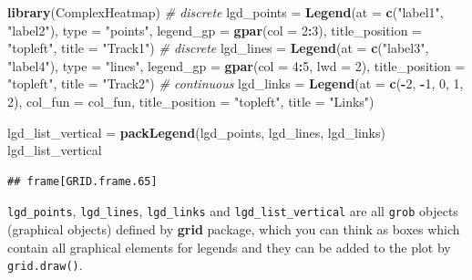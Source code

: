\documentclass[]{book}
\newenvironment{Shaded}{\begin{snugshade}}{\end{snugshade}}
\newcommand{\KeywordTok}[1]{\textcolor[rgb]{0.13,0.29,0.53}{\textbf{#1}}}
\newcommand{\DataTypeTok}[1]{\textcolor[rgb]{0.13,0.29,0.53}{#1}}
\newcommand{\DecValTok}[1]{\textcolor[rgb]{0.00,0.00,0.81}{#1}}
\newcommand{\StringTok}[1]{\textcolor[rgb]{0.31,0.60,0.02}{#1}}
\newcommand{\CommentTok}[1]{\textcolor[rgb]{0.56,0.35,0.01}{\textit{#1}}}
\newcommand{\OperatorTok}[1]{\textcolor[rgb]{0.81,0.36,0.00}{\textbf{#1}}}
\newcommand{\NormalTok}[1]{#1}
\theoremstyle{definition}
\theoremstyle{definition}
\theoremstyle{remark}
\begin{document}
\begin{Shaded}
\begin{Highlighting}[]
\KeywordTok{library}\NormalTok{(ComplexHeatmap)}
\CommentTok{# discrete}
\NormalTok{lgd_points =}\StringTok{ }\KeywordTok{Legend}\NormalTok{(}\DataTypeTok{at =} \KeywordTok{c}\NormalTok{(}\StringTok{"label1"}\NormalTok{, }\StringTok{"label2"}\NormalTok{), }\DataTypeTok{type =} \StringTok{"points"}\NormalTok{, }
    \DataTypeTok{legend_gp =} \KeywordTok{gpar}\NormalTok{(}\DataTypeTok{col =} \DecValTok{2}\OperatorTok{:}\DecValTok{3}\NormalTok{), }\DataTypeTok{title_position =} \StringTok{"topleft"}\NormalTok{, }
    \DataTypeTok{title =} \StringTok{"Track1"}\NormalTok{)}
\CommentTok{# discrete}
\NormalTok{lgd_lines =}\StringTok{ }\KeywordTok{Legend}\NormalTok{(}\DataTypeTok{at =} \KeywordTok{c}\NormalTok{(}\StringTok{"label3"}\NormalTok{, }\StringTok{"label4"}\NormalTok{), }\DataTypeTok{type =} \StringTok{"lines"}\NormalTok{, }
    \DataTypeTok{legend_gp =} \KeywordTok{gpar}\NormalTok{(}\DataTypeTok{col =} \DecValTok{4}\OperatorTok{:}\DecValTok{5}\NormalTok{, }\DataTypeTok{lwd =} \DecValTok{2}\NormalTok{), }\DataTypeTok{title_position =} \StringTok{"topleft"}\NormalTok{, }
    \DataTypeTok{title =} \StringTok{"Track2"}\NormalTok{)}
\CommentTok{# continuous}
\NormalTok{lgd_links =}\StringTok{ }\KeywordTok{Legend}\NormalTok{(}\DataTypeTok{at =} \KeywordTok{c}\NormalTok{(}\OperatorTok{-}\DecValTok{2}\NormalTok{, }\OperatorTok{-}\DecValTok{1}\NormalTok{, }\DecValTok{0}\NormalTok{, }\DecValTok{1}\NormalTok{, }\DecValTok{2}\NormalTok{), }\DataTypeTok{col_fun =}\NormalTok{ col_fun, }
    \DataTypeTok{title_position =} \StringTok{"topleft"}\NormalTok{, }\DataTypeTok{title =} \StringTok{"Links"}\NormalTok{)}

\NormalTok{lgd_list_vertical =}\StringTok{ }\KeywordTok{packLegend}\NormalTok{(lgd_points, lgd_lines, lgd_links)}
\NormalTok{lgd_list_vertical}
\end{Highlighting}
\end{Shaded}

\begin{verbatim}
## frame[GRID.frame.65]
\end{verbatim}

\texttt{lgd\_points}, \texttt{lgd\_lines}, \texttt{lgd\_links} and
\texttt{lgd\_list\_vertical} are all \texttt{grob} objects (graphical
objects) defined by \textbf{grid} package, which you can think as boxes
which contain all graphical elements for legends and they can be added
to the plot by \texttt{grid.draw()}.
\end{document}
